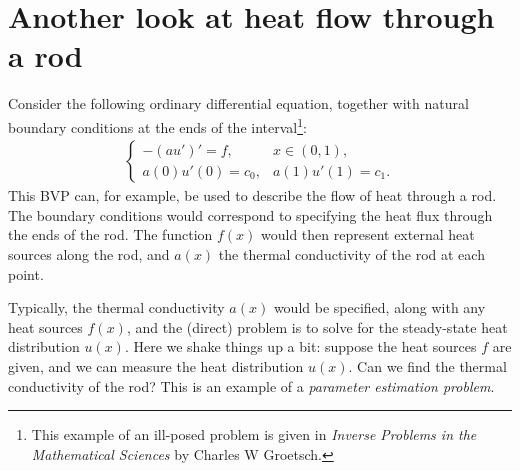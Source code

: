 \section*{Another look at heat flow through a rod}
Consider the following ordinary differential equation, together with natural boundary conditions at the ends of the interval\footnote{This example of an ill-posed problem is given in \textit{Inverse Problems in the Mathematical Sciences} by Charles W Groetsch.}:
\begin{align}
\begin{cases}
	-(au')' = f, & x \in (0,1),\\
	a(0)u'(0) = c_0, & a(1)u'(1) = c_1.
\end{cases} \label{inverse_problems:heat_flow}
\end{align}
This BVP can, for example, be used to describe the flow of heat through a rod.
The boundary conditions would correspond to specifying the heat flux through the ends of the rod.
The function $f(x)$ would then represent external heat sources along the rod, and $a(x)$ the thermal conductivity of the rod at each point. 

Typically, the thermal conductivity $a(x)$ would be specified, along with any heat sources $f(x)$, and the (direct) problem is to solve for the steady-state heat distribution $u(x)$.
Here we shake things up a bit: suppose the heat sources $f$ are given, and we can measure the heat distribution $u(x)$.
Can we find the thermal conductivity of the rod?
This is an example of a \textit{parameter estimation problem}.

